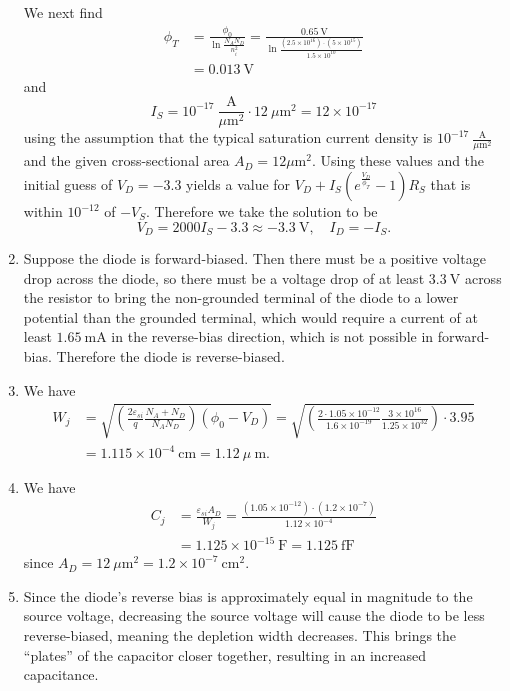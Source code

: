 \documentclass{article}
\begin{document}
\begin{enumerate}[label=(\alph*)]
{    We next find
    \begin{align*}
       \phi_T
    &= \frac{\phi_0}{\ln \frac{N_A N_D}{n_i^2}}
     = \frac{0.65~\mathrm{V}}
            {\ln \frac{(2.5 \times 10^{16}) \cdot (5 \times 10^{15})}
                      {1.5 \times 10^{10}}} \\
    &= 0.013~\mathrm{V}
    \end{align*}
    and
    $$
    I_S = 10^{-17} ~\frac{\mathrm{A}}{\mu \mathrm{m}^2} \cdot 12 ~\mu\mathrm{m}^2
        = 12 \times 10^{-17}
    $$
    using the assumption that the typical saturation current density
    is $10^{-17} ~\frac{\mathrm{A}}{\mu \mathrm{m}^2}$ and the given
    cross-sectional area $A_D = 12 \mu\mathrm{m}^2$. Using these
    values and the initial guess of $V_D = -3.3$ yields a value for
    $V_D + I_S(e^{\frac{V_D}{\phi_T}} - 1)R_S$ that is within
    $10^{-12}$ of $-V_S$. Therefore we take the solution to be
    $$
    V_D = 2000 I_S - 3.3 \approx -3.3 ~\mathrm{V}, \quad I_D = -I_S.
    $$
  }
  \item{
    Suppose the diode is forward-biased. Then there must be a positive
    voltage drop across the diode, so there must be a
    voltage drop of at least $3.3~\mathrm{V}$ across the
    resistor to bring the non-grounded terminal of the diode to a
    lower potential than the grounded terminal, which would require a
    current of at least $1.65~\mathrm{mA}$ in the reverse-bias
    direction, which is not possible in forward-bias. Therefore
    the diode is reverse-biased.
  }
  \item{
    We have
    \begin{align*}
    W_j &= \sqrt{\left(
                   \frac{2 \varepsilon_{si}}{q}
                   \frac{N_A + N_D}{N_A N_D}
                 \right) (\phi_0 - V_D)}
         = \sqrt{\left(
                   \frac{2 \cdot 1.05 \times 10^{-12}}
                        {1.6 \times 10^{-19}}
                   \frac{3 \times 10^{16}}
                        {1.25 \times 10^{32}}
                  \right) \cdot 3.95} \\
        &= 1.115 \times 10^{-4} ~\mathrm{cm}
         = 1.12 ~\mu~\mathrm{m}.
    \end{align*}
  }
  \item{
    We have
    \begin{align*}
      C_j &= \frac{\varepsilon_{si} A_D}{W_j}
           = \frac{(1.05 \times 10^{-12}) \cdot (1.2 \times 10^{-7})}
                  {1.12 \times 10^{-4}} \\
          &= 1.125 \times 10^{-15} ~\mathrm{F}
           = 1.125 ~\mathrm{fF}
    \end{align*}
    since $A_D = 12 ~\mu\mathrm{m}^2 = 1.2 \times 10^{-7} ~\mathrm{cm}^2$.
  }
  \item{
    Since the diode's reverse bias is approximately equal in magnitude
    to the source voltage, decreasing the source voltage will cause
    the diode to be less reverse-biased, meaning the depletion width
    decreases. This brings the ``plates'' of the capacitor closer
    together, resulting in an increased capacitance.
  }
\end{enumerate}
\end{document}
